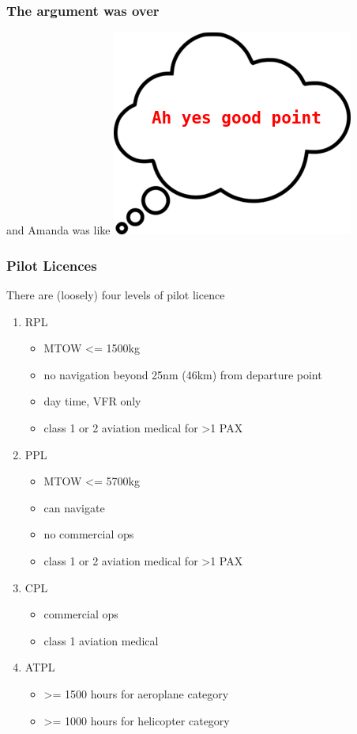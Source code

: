 \begin{frame}
\frametitle{The argument was over}
\begin{block}{and Amanda was like}
\includegraphics[height=0.5\textheight]{image/thought-bubble-good-point.png}
\end{block}
\end{frame}

\begin{frame}
\frametitle{Pilot Licences}
\begin{block}{There are (loosely) four levels of pilot licence}
\begin{enumerate}
\item RPL
  \begin{itemize}
  \item \tiny{MTOW <= 1500kg}
  \item \tiny{no navigation beyond 25nm (46km) from departure point}
  \item \tiny{day time, VFR only}
  \item \tiny{class 1 or 2 aviation medical for >1 PAX}
  \end{itemize}
\item PPL
  \begin{itemize}
  \item \tiny{MTOW <= 5700kg}
  \item \tiny{can navigate}
  \item \tiny{no commercial ops}
  \item \tiny{class 1 or 2 aviation medical for >1 PAX}
  \end{itemize}
\item CPL
  \begin{itemize}
  \item \tiny{commercial ops}
  \item \tiny{class 1 aviation medical}
  \end{itemize}
\item ATPL
  \begin{itemize}
  \item \tiny{>= 1500 hours for aeroplane category}
  \item \tiny{>= 1000 hours for helicopter category}
  \end{itemize}
\end{enumerate}
\end{block}
\end{frame}
